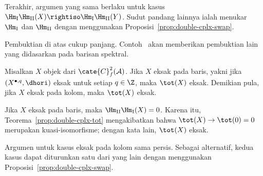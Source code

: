 \begin{bukti}
	Terakhir, argumen yang sama berlaku untuk kasus
	$\Hm_{\mathrm{I}} \Hm_{\mathrm{II}} (X) \rightiso
	\Hm_{\mathrm{I}} \Hm_{\mathrm{II}} (Y)$. Sudut pandang lainnya ialah
	menukar $\Hm_{\mathrm{I}}$ dan $\Hm_{\mathrm{II}}$ dengan menggunakan
	Proposisi~\ref{prop:double-cplx-swap}.
\end{bukti}

Pembuktian di atas cukup panjang. Contoh~ akan
memberikan pembuktian lain yang didasarkan pada barisan spektral.

\begin{korolari}\label{prop:acyclic-assembly}
	Misalkan $X$ objek dari $\cate{C}_f^2(\mathcal{A})$. Jika $X$ eksak pada
	baris, yakni jika $\left( X^{\bullet, q}, \dhori \right)$ eksak untuk
	setiap $q \in \Z$, maka $\tot(X)$ eksak. Demikian pula, jika $X$ eksak
	pada kolom, maka $\tot(X)$ eksak.
\end{korolari}
\begin{bukti}
	Jika $X$ eksak pada baris, maka
	$\Hm_{\mathrm{II}} \Hm_{\mathrm{I}}(X) = 0$. Karena itu,
	Teorema~\ref{prop:double-cplx-tot} mengakibatkan bahwa
	$\tot(X) \to \tot(0) = 0$ merupakan kuasi-isomorfisme; dengan kata lain,
	$\tot(X)$ eksak.

	Argumen untuk kasus eksak pada kolom sama persis. Sebagai alternatif,
	kedua kasus dapat diturunkan satu dari yang lain dengan menggunakan
	Proposisi~\ref{prop:double-cplx-swap}.
\end{bukti}
